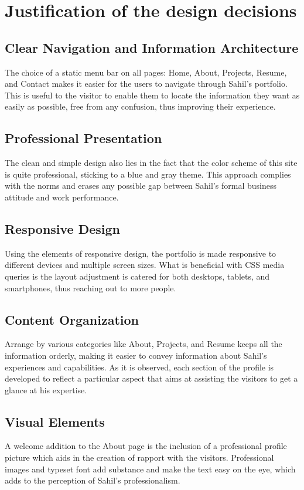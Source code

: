 \documentclass{article}
\begin{document}
\section{Justification of the design decisions}
\subsection{Clear Navigation and Information Architecture}
The choice of a static menu bar on all pages: Home, About, Projects, Resume, and Contact makes it easier for the users to navigate through Sahil’s portfolio. This is useful to the visitor to enable them to locate the information they want as easily as possible, free from any confusion, thus improving their experience. 

\subsection{Professional Presentation}
The clean and simple design also lies in the fact that the color scheme of this site is quite professional, sticking to a blue and gray theme. This approach complies with the norms and erases any possible gap between Sahil’s formal business attitude and work performance. 

\subsection{Responsive Design}
Using the elements of responsive design, the portfolio is made responsive to different devices and multiple screen sizes. What is beneficial with CSS media queries is the layout adjustment is catered for both desktops, tablets, and smartphones, thus reaching out to more people. 

\subsection{Content Organization}
Arrange by various categories like About, Projects, and Resume keeps all the information orderly, making it easier to convey information about Sahil’s experiences and capabilities. As it is observed, each section of the profile is developed to reflect a particular aspect that aims at assisting the visitors to get a glance at his expertise. 

\subsection{Visual Elements}
A welcome addition to the About page is the inclusion of a professional profile picture which aids in the creation of rapport with the visitors. Professional images and typeset font add substance and make the text easy on the eye, which adds to the perception of Sahil’s professionalism. 
\end{document}
